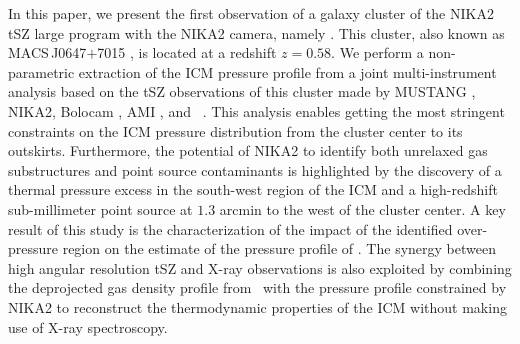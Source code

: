 \documentclass[traditabstract]{aa}
\begin{document}
\indent In this paper, we present the first observation of a galaxy cluster of the NIKA2 tSZ large program with the NIKA2 camera, namely \psz. This cluster, also known as {MACS\,J0647$+$7015} \citep{ebe01}, is located at a redshift $z=0.58$. We perform a non-parametric extraction of the ICM pressure profile from a joint multi-instrument analysis based on the tSZ observations of this cluster made by MUSTANG \citep{you15}, NIKA2, Bolocam \citep{say13,cza15}, AMI \citep{per15}, and \planck\ \citep{pla16c}. This analysis enables getting the most stringent constraints on the ICM pressure distribution from the cluster center to its outskirts. Furthermore, the potential of NIKA2 to identify both unrelaxed gas substructures and point source contaminants is highlighted by the discovery of a thermal pressure excess in the south-west region of the ICM and a high-redshift sub-millimeter point source at $1.3$ arcmin to the west of the cluster center. A key result of this study is the characterization of the impact of the identified over-pressure region on the estimate of the pressure profile of \psz. The synergy between high angular resolution tSZ and X-ray observations is also exploited by combining the deprojected gas density profile from \xmm\ with the pressure profile constrained by NIKA2 to reconstruct the thermodynamic properties of the ICM without making use of X-ray spectroscopy.\\
\end{document}

